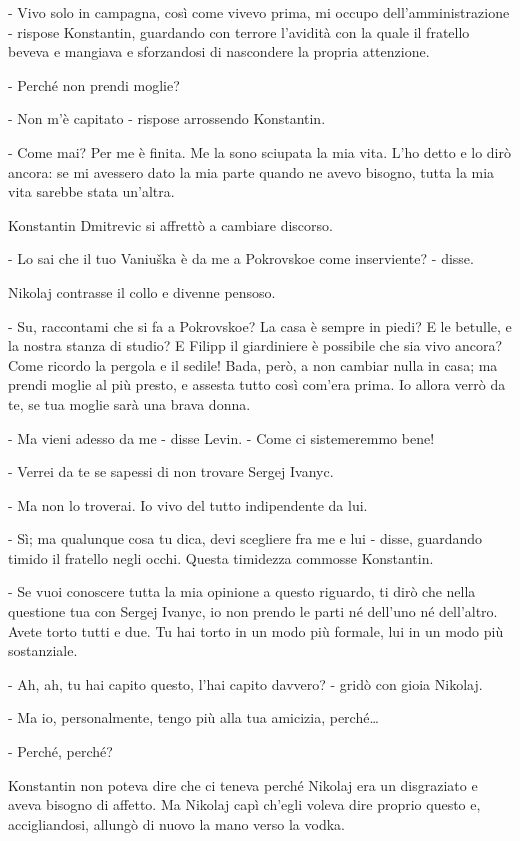 - Vivo solo in campagna, così come vivevo prima, mi occupo dell'amministrazione - rispose Konstantin, guardando con terrore l'avidità con la quale il fratello beveva e mangiava e sforzandosi di nascondere la propria attenzione. 

- Perché non prendi moglie? 

- Non m'è capitato - rispose arrossendo Konstantin. 

- Come mai? Per me è finita. Me la sono sciupata la mia vita. L'ho detto e lo dirò ancora: se mi avessero dato la mia parte quando ne avevo bisogno, tutta la mia vita sarebbe stata un'altra. 

Konstantin Dmitrevic si affrettò a cambiare discorso. 

- Lo sai che il tuo Vaniuška è da me a Pokrovskoe come inserviente? - disse. 

Nikolaj contrasse il collo e divenne pensoso. 

- Su, raccontami che si fa a Pokrovskoe? La casa è sempre in piedi? E le betulle, e la nostra stanza di studio? E Filipp il giardiniere è possibile che sia vivo ancora? Come ricordo la pergola e il sedile! Bada, però, a non cambiar nulla in casa; ma prendi moglie al più presto, e assesta tutto così com'era prima. Io allora verrò da te, se tua moglie sarà una brava donna. 

- Ma vieni adesso da me - disse Levin. - Come ci sistemeremmo bene! 

- Verrei da te se sapessi di non trovare Sergej Ivanyc. 

- Ma non lo troverai. Io vivo del tutto indipendente da lui. 

- Sì; ma qualunque cosa tu dica, devi scegliere fra me e lui - disse, guardando timido il fratello negli occhi. Questa timidezza commosse Konstantin. 

- Se vuoi conoscere tutta la mia opinione a questo riguardo, ti dirò che nella questione tua con Sergej Ivanyc, io non prendo le parti né dell'uno né dell'altro. Avete torto tutti e due. Tu hai torto in un modo più formale, lui in un modo più sostanziale. 

- Ah, ah, tu hai capito questo, l'hai capito davvero? - gridò con gioia Nikolaj. 

- Ma io, personalmente, tengo più alla tua amicizia, perché\ldots{}

- Perché, perché? 

Konstantin non poteva dire che ci teneva perché Nikolaj era un disgraziato e aveva bisogno di affetto. Ma Nikolaj capì ch'egli voleva dire proprio questo e, accigliandosi, allungò di nuovo la mano verso la vodka. 

